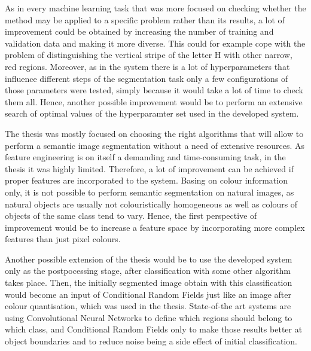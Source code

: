 As in every machine learning task that was more focused on checking whether the method may be applied to a specific problem rather than its results, a lot of improvement could be obtained by increasing the number of training and validation data and making it more diverse. This could for example cope with the problem of distinguishing the vertical stripe of the letter H with other narrow, red regions. Moreover, as in the system there is a lot of hyperparameters that influence different steps of the segmentation task only a few configurations of those parameters were tested, simply because it would take a lot of time to check them all. Hence, another possible improvement would be to perform an extensive search of optimal values of the hyperparamter set used in the developed system. 

The thesis was mostly focused on choosing the right algorithms that will allow to perform a semantic image segmentation without a need of extensive resources. As feature engineering is on itself a demanding and time-consuming task, in the thesis it was highly limited. Therefore, a lot of improvement can be achieved if proper features are incorporated to the system. Basing on colour information only, it is not possible to perform semantic segmentation on natural images, as natural objects are usually not colouristically homogeneous as well as colours of objects of the same class tend to vary. Hence, the first perspective of improvement would be to increase a feature space by incorporating more complex features than just pixel colours.

Another possible extension of the thesis would be to use the developed system only as the postpocessing stage, after classification with some other algorithm takes place. Then, the initially segmented image obtain with this classification would become an input of Conditional Random Fields just like an image after colour quantisation, which was used in the thesis. State-of-the art systems are using Convolutional Neural Networks to define which regions should belong to which class, and Conditional Random Fields only to make those results better at object boundaries and to reduce noise being a side effect of initial classification. 